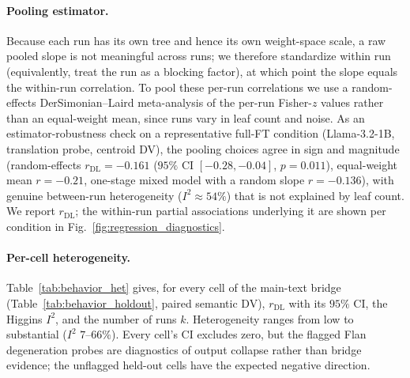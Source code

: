 \documentclass{article}
\theoremstyle{definition}
\theoremstyle{plain}
\begin{document}
\paragraph{Pooling estimator.} Because each run has its own tree and hence its own weight-space scale, a
raw pooled slope is not meaningful across runs; we therefore standardize within run (equivalently, treat
the run as a blocking factor), at which point the slope equals the within-run correlation. To pool these
per-run correlations we use a random-effects DerSimonian--Laird meta-analysis of the per-run Fisher-$z$
values rather than an equal-weight mean, since runs vary in leaf count and noise. As an estimator-robustness check on a representative full-FT
condition (Llama-3.2-1B, translation probe, centroid DV), the pooling choices agree in sign and
magnitude (random-effects $r_{\mathrm{DL}}=-0.161$ ($95\%$ CI $[-0.28,-0.04]$, $p=0.011$), equal-weight mean
$r=-0.21$, one-stage mixed model with a random slope $r=-0.136$), with genuine between-run heterogeneity
($I^2\approx54\%$) that is not explained by leaf count. We report $r_{\mathrm{DL}}$; the within-run partial
associations underlying it are shown per condition in Fig.~\ref{fig:regression_diagnostics}.

\paragraph{Per-cell heterogeneity.} Table~\ref{tab:behavior_het} gives, for every cell of the main-text
bridge (Table~\ref{tab:behavior_holdout}, paired semantic DV), $r_{\mathrm{DL}}$ with its $95\%$ CI,
the Higgins $I^2$, and the number of runs $k$. Heterogeneity ranges from low to substantial ($I^2$ $7$--$66\%$).
Every cell's CI excludes zero, but the flagged Flan degeneration probes are diagnostics of output
collapse rather than bridge evidence; the unflagged held-out cells have the expected negative direction.
\end{document}
